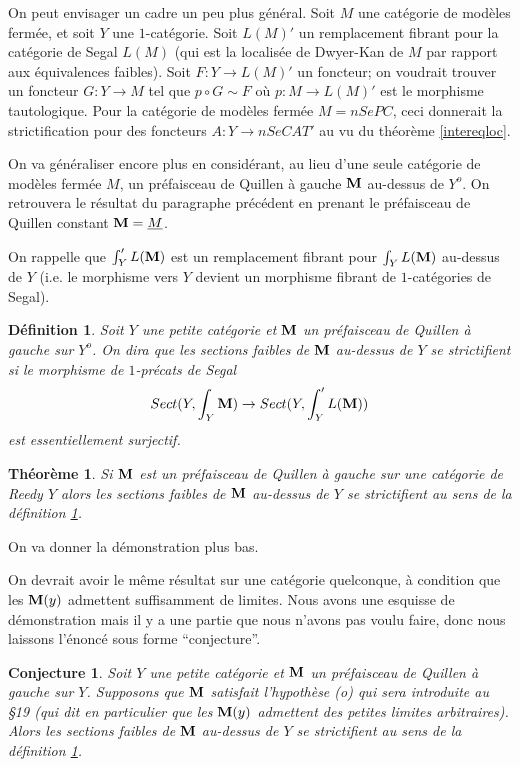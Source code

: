 \documentclass[12pt]{article}
\newtheorem{conjecture}[lemma]{Conjecture}
\newtheorem{theoreme}[lemma]{Th\'eor\`eme}
\newtheorem{definition}[lemma]{D\'efinition}
\newcommand{\mm}{{\bf M}}
\begin{document}
On peut envisager un cadre un peu plus g\'en\'eral.
Soit $M$ une cat\'egorie de mod\`eles ferm\'ee, et soit $Y$ une
$1$-cat\'egorie. Soit $L(M)'$ un remplacement fibrant pour la cat\'egorie de
Segal $L(M)$ (qui est la localis\'ee de Dwyer-Kan de $M$ par
rapport aux \'equivalences
faibles). Soit
$F: Y \rightarrow L(M)'$ un foncteur; on voudrait trouver un foncteur
$G: Y \rightarrow M$ tel
que
$p\circ G \sim F$ o\`u $p: M\rightarrow L(M)'$ est le morphisme
tautologique. Pour la
cat\'egorie
de mod\`eles ferm\'ee $M=nSePC$, ceci donnerait la strictification pour des
foncteurs $A:Y \rightarrow nSeCAT'$ au vu
du th\'eor\`eme \ref{intereqloc}.


On va g\'en\'eraliser encore plus en consid\'erant, au lieu d'une seule
cat\'egorie de mod\`eles ferm\'ee $M$, un pr\'efaisceau de Quillen \`a gauche
$\mm$ au-dessus de $Y ^o$. On retrouvera le r\'esultat du paragraphe
pr\'ec\'edent en prenant le pr\'efaisceau de Quillen constant $\mm =
\underline{M}$.

On rappelle que $\int '_YL(\mm )$ est un remplacement fibrant pour $\int
_YL(\mm )$ au-dessus de $Y$
(i.e. le morphisme vers $Y$ devient un morphisme fibrant de
$1$-cat\'egories de Segal).

\begin{definition}
\label{sestrictifient}
Soit $Y$ une petite cat\'egorie et $\mm$ un pr\'efaisceau de Quillen \`a gauche
sur $Y^o$. On dira que {\em les sections faibles de $\mm$ au-dessus de $Y$ se
strictifient} si le morphisme de $1$-pr\'ecats de Segal
$$
Sect (Y, \int _Y\mm )\rightarrow Sect (Y, \int '_YL(\mm ))
$$
est essentiellement surjectif.
\end{definition}



\begin{theoreme}
\label{strictif1A}
Si $\mm $ est un pr\'efaisceau de Quillen \`a gauche sur une cat\'egorie de
Reedy
$Y$ alors les sections faibles de $\mm$ au-dessus de $Y$ se
strictifient au sens de la d\'efinition \ref{sestrictifient}.
\end{theoreme}

On va donner la d\'emonstration plus bas.

On devrait avoir le m\^eme r\'esultat sur une cat\'egorie quelconque, \`a
condition que les $\mm (y)$ admettent suffisamment de limites. Nous avons une
esquisse de d\'emonstration mais il y a une partie que nous n'avons pas voulu
faire, donc nous laissons l'\'enonc\'e sous forme ``conjecture''.

\begin{conjecture}
\label{strictif1B}
Soit $Y$ une petite  cat\'egorie et $\mm$ un pr\'efaisceau de Quillen \`a gauche
sur $Y$. Supposons que $\mm$ satisfait l'hypoth\`ese (o) qui sera introduite
au \S 19 (qui dit en particulier que les $\mm (y)$ admettent des
petites limites arbitraires).  Alors les sections faibles de $\mm$
au-dessus de $Y$ se
strictifient au sens de la d\'efinition \ref{sestrictifient}.
\end{conjecture}
\end{document}
